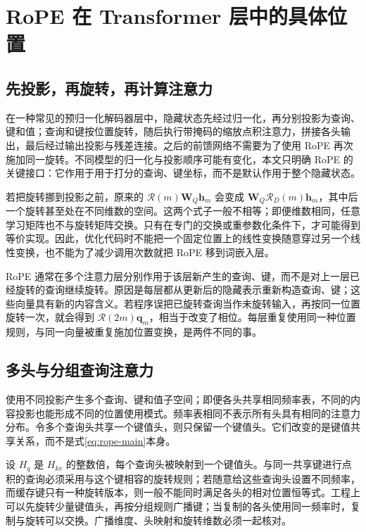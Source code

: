 \documentclass[UTF8,12pt,a4paper,fontset=fandol]{ctexart}
\begin{document}
\section{RoPE 在 Transformer 层中的具体位置}
\label{sec:rope-architecture}

\subsection{先投影，再旋转，再计算注意力}
在一种常见的预归一化解码器层中，隐藏状态先经过归一化，再分别投影为查询、键和值；查询和键按位置旋转，随后执行带掩码的缩放点积注意力，拼接各头输出，最后经过输出投影与残差连接。之后的前馈网络不需要为了使用 RoPE 再次施加同一旋转。不同模型的归一化与投影顺序可能有变化，本文只明确 RoPE 的关键接口：它作用于用于打分的查询、键坐标，而不是默认作用于整个隐藏状态。

若把旋转挪到投影之前，原来的 $\mathcal R(m)\mathbf W_Q\mathbf h_m$ 会变成 $\mathbf W_Q\mathcal R_D(m)\mathbf h_m$，其中后一个旋转甚至处在不同维数的空间。这两个式子一般不相等；即便维数相同，任意学习矩阵也不与旋转矩阵交换。只有在专门的交换或重参数化条件下，才可能得到等价实现。因此，优化代码时不能把一个固定位置上的线性变换随意穿过另一个线性变换，也不能为了减少调用次数就把 RoPE 移到词嵌入层。

RoPE 通常在多个注意力层分别作用于该层新产生的查询、键，而不是对上一层已经旋转的查询继续旋转。原因是每层都从更新后的隐藏表示重新构造查询、键；这些向量具有新的内容含义。若程序误把已旋转查询当作未旋转输入，再按同一位置旋转一次，就会得到 $\mathcal R(2m)\mathbf q_m$，相当于改变了相位。每层重复使用同一种位置规则，与同一向量被重复施加位置变换，是两件不同的事。

\subsection{多头与分组查询注意力}
使用不同投影产生多个查询、键和值子空间；即便各头共享相同频率表，不同的内容投影也能形成不同的位置使用模式。频率表相同不表示所有头具有相同的注意力分布。令多个查询头共享一个键值头，则只保留一个键值头。它们改变的是键值共享关系，而不是式\eqref{eq:rope-main}本身。

设 $H_q$ 是 $H_{kv}$ 的整数倍，每个查询头被映射到一个键值头。与同一共享键进行点积的查询必须采用与这个键相容的旋转规则；若随意给这些查询头设置不同频率，而缓存键只有一种旋转版本，则一般不能同时满足各头的相对位置恒等式。工程上可以先旋转少量键值头，再按分组规则广播键；当复制的各头使用同一频率时，复制与旋转可以交换。广播维度、头映射和旋转维数必须一起核对。
\end{document}

